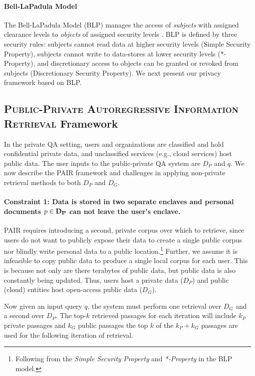 \documentclass{article}
\renewcommand\cite{\citep}	\newcommand\shortcite{\citeyearpar}\newcommand\newcite{\citet}
\newcommand{\problemlongname}{\textsc{Public-Private Autoregressive Information Retrieval}\xspace}
\newcommand{\problemshortname}{\textsc{PAIR}\xspace}
\begin{document}
\paragraph{Bell-LaPadula Model} The Bell-LaPadula Model (BLP) manages the access of \textit{subjects} with assigned clearance levels to \textit{objects} of assigned security levels \cite{bell2976blm}. BLP is defined by three security rules: subjects cannot read data at higher security levels (Simple Security Property), subjects cannot write to data-stores at lower security levels (*-Property), and discretionary access to objects can be granted or revoked from subjects (Discretionary Security Property). We next present our privacy framework based on BLP.


\subsection{\problemlongname Framework} In the private QA setting, users and organizations are classified and hold confidential private data, and unclassified services (e.g., cloud services) host public data. The user inputs to the public-private QA system are ${D_P}$ and ${q}$. We now describe the \problemshortname framework and challenges in applying non-private retrieval methods to both ${D_P}$ and ${D_G}$.

\paragraph{Constraint 1: Data is stored in two separate enclaves and personal documents $p \in \bf{D_P}$ can not leave the user's enclave.}  \problemshortname requires introducing a second, private corpus over which to retrieve, since users do not want to publicly expose their data to create a single public corpus nor blindly write personal data to a public location.\footnote{Following from the \textit{Simple Security Property} and \textit{*-Property} in the BLP model.} Further, we assume it is infeasible to copy public data to produce a single local corpus for each user. This is because not only are there terabytes of public data, but public data is also constantly being updated. Thus, users host a  private data (${D_P}$) and public (cloud) entities host open-access public data (${D_G}$).

Now given an input query $q$, the system must perform one retrieval over ${D_G}$ and a second over ${D_P}$. The top-$k$ retrieved passages for each iteration will include $k_P$ private passages and $k_G$ public passages the top $k$ of the $k_P + k_G$ passages are used for the following iteration of retrieval. 
\end{document}
